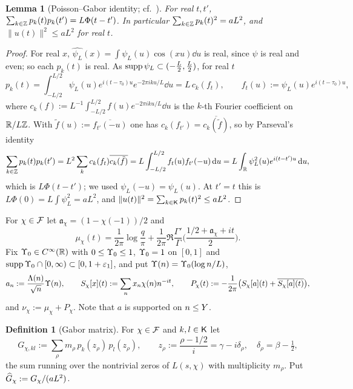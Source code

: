 \documentclass[11pt]{amsart}
\newtheorem{lemma}[theorem]{Lemma}
\theoremstyle{definition}
\newtheorem{definition}[theorem]{Definition}
\theoremstyle{remark}
\numberwithin{equation}{section}
\begin{document}
\begin{lemma}[Poisson--Gabor identity; cf.\ {\cite[Lemma~5.1]{HY26}}]\label{lem:gabor}
For real $t,t'$, $\sum_{k\in\mathbb Z}p_k(t)p_k(t')=L\Phi(t-t')$. In particular $\sum_{k\in\mathbb Z}p_k(t)^2=aL^2$, and $\|u(t)\|^2\le aL^2$ for real $t$.
\end{lemma}
\begin{proof}
For real $x$, $\widehat{\psi_L}(x)=\int\psi_L(u)\cos(xu)\dd u$ is real, since $\psi$ is real and even; so each $p_k(t)$ is real. As $\operatorname{supp}\psi_L\subset(-\frac L2,\frac L2)$, for real $t$
\[
p_k(t)=\int_{-L/2}^{L/2}\psi_L(u)e^{i(t-\tau_0)u}e^{-2\pi iku/L}\dd u=L\,c_k(f_t),\qquad f_t(u):=\psi_L(u)e^{i(t-\tau_0)u},
\]
where $c_k(f):=L^{-1}\int_{-L/2}^{L/2}f(u)e^{-2\pi iku/L}\dd u$ is the $k$-th Fourier coefficient on $\mathbb R/L\mathbb Z$. With $\tilde f(u):=\overline{f_{t'}(-u)}$ one has $c_k(f_{t'})=\overline{c_k(\tilde f)}$, so by Parseval's identity
\[
\sum_{k\in\mathbb Z}p_k(t)p_k(t')=L^2\sum_kc_k(f_t)\overline{c_k(\tilde f)}=L\int_{-L/2}^{L/2}f_t(u)f_{t'}(-u)\,\mathrm d u=L\int_\mathbb R\psi_L^2(u)e^{i(t-t')u}\,\mathrm d u,
\]
which is $L\Phi(t-t')$; we used $\psi_L(-u)=\psi_L(u)$. At $t'=t$ this is $L\Phi(0)=L\int\psi_L^2=aL^2$, and $\|u(t)\|^2=\sum_{k\in\mathsf K}p_k(t)^2\le aL^2$.
\end{proof}

For $\chi\in\mathcal F$ let $\mathfrak a_\chi=(1-\chi(-1))/2$ and
\begin{equation}\label{eq:mu}
\mu_\chi(t)=\frac1{2\pi}\log\frac q\pi+\frac1{2\pi}\Re\frac{\Gamma'}{\Gamma}\Big(\frac{1/2+\mathfrak a_\chi+it}2\Big).
\end{equation}
Fix $\Upsilon_0\in C^\infty(\mathbb R)$ with $0\le\Upsilon_0\le1$, $\Upsilon_0=1$ on $[0,1]$ and $\operatorname{supp}\Upsilon_0\cap[0,\infty)\subset[0,1+\varepsilon_1]$, and put $\Upsilon(n)=\Upsilon_0(\log n/L)$,
\begin{equation}\label{eq:an}
a_n:=\frac{\Lambda(n)}{\sqrt n}\Upsilon(n),\qquad S_\chi[x](t):=\sum_nx_n\chi(n)n^{-it},\qquad P_\chi(t):=-\frac1{2\pi}\big(S_\chi[a](t)+\overline{S_\chi[a](t)}\big),
\end{equation}
and $\nu_\chi:=\mu_\chi+P_\chi$. Note that $a$ is supported on $n\le Y$.

\begin{definition}[Gabor matrix]
For $\chi\in\mathcal F$ and $k,l\in\mathsf K$ let
\begin{equation}\label{eq:Gdef}
G_{\chi,kl}:=\sum_{\rho}m_\rho\,p_k(z_\rho)\,p_l(z_\rho),\qquad z_\rho:=\frac{\rho-1/2}{i}=\gamma-i\delta_\rho,\quad\delta_\rho=\beta-\tfrac12,
\end{equation}
the sum running over the nontrivial zeros of $L(s,\chi)$ with multiplicity $m_\rho$. Put $\widehat G_\chi:=G_\chi/(aL^2)$.
\end{definition}
\end{document}
